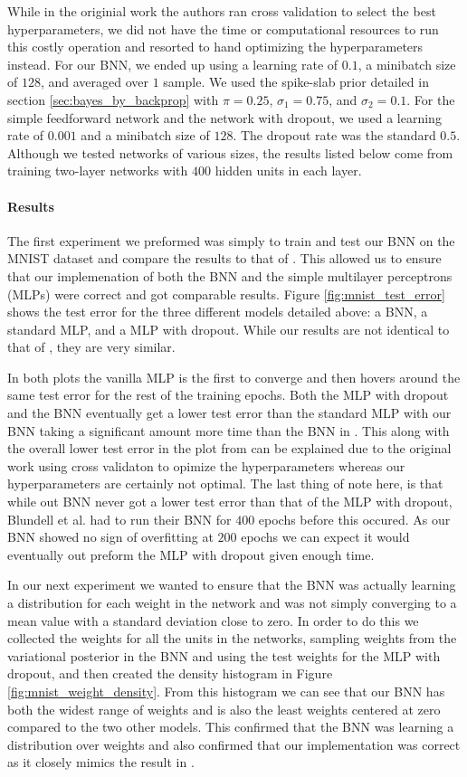 \documentclass[11pt]{article}
\begin{document}
While in the originial work the authors ran cross validation to select the best
hyperparameters, we did not have the time or computational resources to run this
costly operation and resorted to hand optimizing the hyperparameters instead.
For our BNN, we ended up using a learning rate of $0.1$, a minibatch size of 
$128$, and averaged over $1$ sample. We used the spike-slab prior detailed in
section \ref{sec:bayes_by_backprop} with $\pi = 0.25$, $\sigma_1 = 0.75$, and 
$\sigma_2 = 0.1$. For the simple feedforward network and the network with 
dropout, we used a learning rate of $0.001$ and a minibatch size of $128$.
The dropout rate was the standard $0.5$. Although we tested networks of various
sizes, the results listed below come from training two-layer networks with
$400$ hidden units in each layer.

\paragraph{Results}
The first experiment we preformed was simply to train and test our BNN on the 
MNIST dataset and compare the results to that of \cite{blarg}. This allowed us
to ensure that our implemenation of both the BNN and the simple multilayer
perceptrons (MLPs) were correct and got comparable results. Figure
\ref{fig:mnist_test_error} shows the test error for the three different models
detailed above: a BNN, a standard MLP, and a MLP with dropout. While our 
results are not identical to that of \cite{blarg}, they are very similar. 

In both plots the vanilla MLP is the first to converge and then hovers around
the same test error for the rest of the training epochs. Both the MLP with
dropout and the BNN eventually get a lower test error than the standard MLP
with our BNN taking a significant amount more time than the BNN in 
\cite{blarg}. This along with the overall lower test error in the plot from
\cite {blarg} can be explained due to the original work using cross validaton
to opimize the hyperparameters whereas our hyperparameters are certainly not
optimal. The last thing of note here, is that while out BNN never got a lower
test error than that of the MLP with dropout, Blundell et al. had to run their
BNN for $400$ epochs before this occured. As our BNN showed no sign of 
overfitting at $200$ epochs we can expect it would eventually out preform the 
MLP with dropout given enough time.

In our next experiment we wanted to ensure that the BNN was actually learning 
a distribution for each weight in the network and was not simply converging to
a mean value with a standard deviation close to zero. In order to do this we
collected the weights for all the units in the networks, sampling weights 
from the variational posterior in the BNN and using the test weights for the 
MLP with dropout, and then created the density histogram in Figure 
\ref{fig:mnist_weight_density}. From this histogram we can see that our BNN
has both the widest range of weights and is also the least weights centered at
zero compared to the two other models. This confirmed that the BNN was learning
a distribution over weights and also confirmed that our implementation was 
correct as it closely mimics the result in \cite{blarg}.
\end{document}
